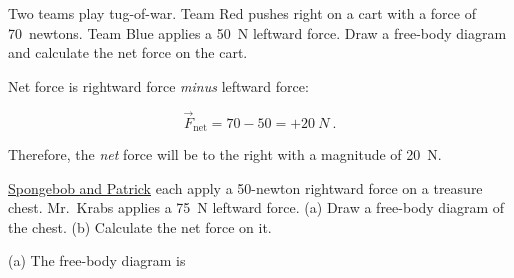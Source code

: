 \documentclass[main.tex]{subfiles}
\begin{document}

\begin{example} \label{ex:FnetFromFBD} 
    Two teams play tug-of-war. Team Red pushes right on a cart with a force of \SI{70}{newtons}. Team Blue applies a \SI{50}{N} leftward force. Draw a free-body diagram and calculate the net force on the cart.
\end{example}

\Solution

\begin{center}
    
\end{center}

Net force is rightward force \textit{minus} leftward force:

\begin{equation*}
    \vec{F}_{\text{net}} = 70 - 50 = +\SI{20}{N}\ .
\end{equation*}

Therefore, the \textit{net} force will be to the right with a magnitude of \SI{20}{N}.

\begin{example}
\href{https://youtu.be/7e3XhWMHolU}{Spongebob and Patrick} each apply a 50-newton rightward force on a treasure chest. Mr.~Krabs applies a \SI{75}{N} leftward force. (a) Draw a free-body diagram of the chest. (b) Calculate the net force on it.
\end{example}

\Solution (a) The free-body diagram is
\end{document}
